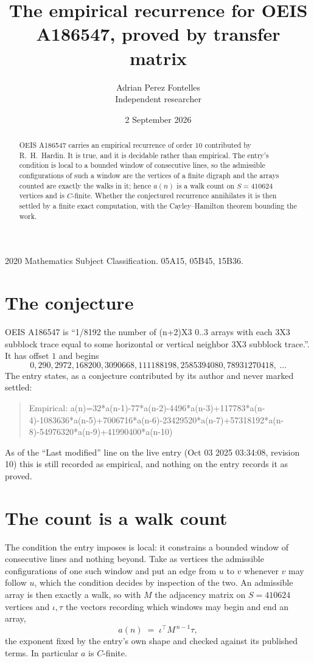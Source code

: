 \documentclass[11pt,a4paper]{article}
\title{The empirical recurrence for OEIS A186547, proved by transfer matrix}
\author{Adrian Perez Fontelles\\ \small Independent researcher}
\date{2 September 2026}
\theoremstyle{plain}
\theoremstyle{definition}
\begin{document}
\maketitle

\begin{abstract}
OEIS A186547 carries an empirical recurrence of order $10$ contributed by R.~H.~Hardin. It is
true, and it is decidable rather than empirical. The entry's condition is local to a bounded window of consecutive lines, so
the admissible configurations of such a window are the vertices of a finite digraph and the
arrays counted are exactly the walks in it; hence $a(n)$ is a walk count on $S=410624$ vertices
and is $C$-finite. Whether the conjectured recurrence annihilates it is then settled by a
finite exact computation, with the Cayley--Hamilton theorem bounding the work.
\end{abstract}

\noindent\small 2020 Mathematics Subject Classification. 05A15, 05B45, 15B36.\normalsize

\section{The conjecture}

OEIS A186547 is ``1/8192 the number of (n+2)X3 0..3 arrays with each 3X3 subblock trace equal to some horizontal or vertical neighbor 3X3 subblock trace.''. It has offset $1$ and begins
\[
0, 290, 2972, 168200, 3090668, 111188198, 2585394080, 78931270418,\ \dots
\]
The entry states, as a conjecture contributed by its author and never marked settled:
\begin{quote}
Empirical: a(n)=32*a(n-1)-77*a(n-2)-4496*a(n-3)+117783*a(n-4)-1083636*a(n-5)+7006716*a(n-6)-23429520*a(n-7)+57318192*a(n-8)-54976320*a(n-9)+41990400*a(n-10)
\end{quote}
As of the ``Last modified'' line on the live entry (Oct 03 2025 03:34:08, revision 10) this is still
recorded as empirical, and nothing on the entry records it as proved.

\section{The count is a walk count}

The condition the entry imposes is local: it constrains a bounded window of consecutive lines and nothing beyond. Take as
vertices the admissible configurations of one such window and put an edge from $u$ to $v$
whenever $v$ may follow $u$, which the condition decides by inspection of the two. An
admissible array is then exactly a walk, so with $M$ the adjacency matrix on $S=410624$ vertices
and $\iota,\tau$ the vectors recording which windows may begin and end an array,
\[
a(n)\;=\;\iota^{\!\top}M^{\,n-1}\tau ,
\]
the exponent fixed by the entry's own shape and checked against its published terms. In
particular $a$ is $C$-finite.
\end{document}
